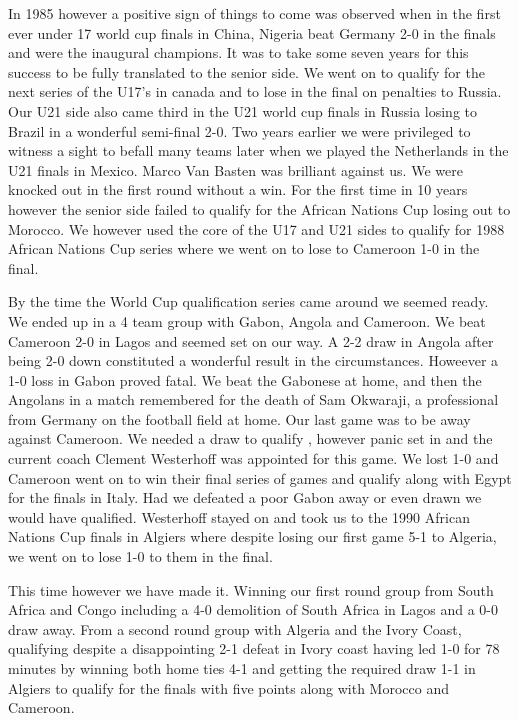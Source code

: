 In 1985 however a positive sign of things to come was observed when in the 
first ever under 17 world cup finals in China, Nigeria beat Germany 2-0 in the 
finals and were the inaugural champions. It was to take some seven years for 
this success to be fully translated to the senior side. We went on to qualify 
for the next series of the U17's in canada and to lose in the final on 
penalties to Russia. Our U21 side also came third in the U21 world cup finals 
in Russia losing to Brazil in a wonderful semi-final 2-0. Two years earlier we 
were privileged to witness a sight to befall many teams later when we played 
the Netherlands in the U21 finals in Mexico. Marco Van Basten was brilliant 
against us. We were knocked out in the first round without a win. For the first
time in 10 years however the senior side failed to qualify for the African 
Nations Cup losing out to Morocco. We however used the core of the U17 and U21
sides to qualify for 1988 African Nations Cup series where we went on to lose 
to Cameroon 1-0 in the final.

By the time the World Cup qualification series came around we seemed ready. We
ended up in a 4 team group with Gabon, Angola and Cameroon. We beat Cameroon 
2-0 in Lagos and seemed set on our way. A 2-2 draw in Angola after being 2-0 
down constituted a wonderful result in the circumstances. Howeever a 1-0 loss 
in Gabon proved fatal. We beat the Gabonese at home, and then the Angolans in a
match remembered for the death of Sam Okwaraji, a professional from Germany on
the football field at home. Our last game was to be away against Cameroon. We 
needed a draw to qualify , however panic set in and the current coach Clement 
Westerhoff was appointed for this game. We lost 1-0 and Cameroon went on to win
their final series of games and qualify along with Egypt for the finals in 
Italy. Had we defeated a poor Gabon away or even drawn we would have qualified.
Westerhoff stayed on and took us to the 1990 African Nations Cup finals in 
Algiers where despite losing our first game 5-1 to Algeria, we went on to lose 
1-0 to them in the final.

This time however we have made it. Winning our first round group from South 
Africa and Congo including a 4-0 demolition of South Africa in Lagos and a 0-0
draw away. From a second round group with Algeria and the Ivory Coast, 
qualifying despite a disappointing 2-1 defeat in Ivory coast having led 1-0 for
78 minutes by winning both home ties 4-1 and getting the required draw 1-1 in 
Algiers to qualify for the finals with five points along with Morocco and 
Cameroon.


